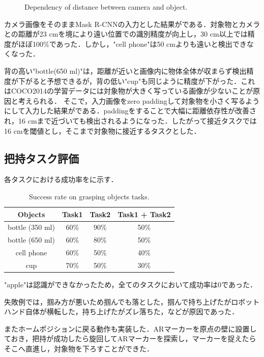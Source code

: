 \begin{figure}[H]
\begin{minipage}{0.49\columnwidth}
        \label{fig:mrcnn距離パディング}
    \end{minipage}
    \caption{Dependency of distance between camera and object.}
    \label{fig:mrcnn距離}
\end{figure}
カメラ画像をそのままMask R-CNNの入力とした結果がである．対象物とカメラとの距離が23 cmを境により遠い位置での識別精度が向上し，30 cm以上では精度がほぼ100\%であった．しかし，"cell phone"は50 cmよりも遠いと検出できなくなった．

背の高い"bottle(650 ml)"は，距離が近いと画像内に物体全体が収まらず検出精度が下がると予想できるが，背の低い"cup"も同じように精度が下がった．これはCOCO2014の学習データには対象物が大きく写っている画像が少ないことが原因と考えられる．
そこで，入力画像をzero paddingして対象物を小さく写るようにして入力した結果がである．paddingをすることで大幅に距離依存性が改善され，16 cmまで近づいても検出されるようになった．したがって接近タスクでは16 cmを閾値とし，そこまで対象物に接近するタスクとした．

\subsection{把持タスク評価}
各タスクにおける成功率をに示す．
\begin{table}[H]
    \centering
    \caption{Success rate on grasping objects tasks.}
    \begin{tabular}{cccc}\toprule
        Objects & Task1 & Task2 & Task1 + Task2 \\ \midrule
        bottle (350 ml) & 60\% & 90\% & 50\% \\
        bottle (650 ml) & 60\% & 80\% & 50\% \\
        cell phone & 60\% & 50\% & 40\% \\ 
        cup & 70\% & 50\% & 30\% \\ \bottomrule
    \end{tabular} 
    \label{tab:把持成功率}
\end{table}
"apple"は認識ができなかったため，全てのタスクにおいて成功率は0であった．

失敗例では，掴み方が悪いため掴んでも落とした，掴んで持ち上げたがロボットハンド自体が横転した，持ち上げたがズレ落ちた，などが原因であった．

またホームポジションに戻る動作も実装した．ARマーカーを原点の壁に設置しておき，把持が成功したら旋回してARマーカーを探索し，マーカーを捉えたらそこへ直進し，対象物を下ろすことができた．


